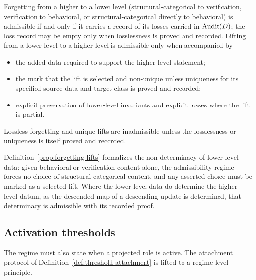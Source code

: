 \begin{definition}\label{prop:forgetting-lifts}
Forgetting from a higher to a lower level (structural-categorical to
verification, verification to behavioral, or structural-categorical directly to
behavioral) is admissible if and only if it carries a record of
its losses carried in \(\operatorname{Audit}\!\left(D\right)\); the loss record may be empty only when
losslessness is proved and recorded. Lifting from a lower level to a higher level is
admissible only when accompanied by
\begin{itemize}[topsep=2pt,itemsep=1pt]
  \item the added data required to support the higher-level statement;
  \item the mark that the lift is selected and non-unique unless uniqueness for its specified source data and target class is proved and recorded;
  \item explicit preservation of lower-level invariants and explicit
    losses where the lift is partial.
\end{itemize}
Lossless forgetting and unique lifts are inadmissible unless the losslessness
or uniqueness is itself proved and recorded.
\end{definition}

\begin{remark}\label{rem:lower-to-higher-non-determinacy}
Definition~\ref{prop:forgetting-lifts} formalizes the non-determinacy of
lower-level data: given behavioral or verification content alone, the admissibility regime
forces no choice of structural-categorical content, and any asserted choice
must be marked as a selected lift. Where the lower-level data do determine the
higher-level datum, as the descended map of a descending update is determined,
that determinacy is admissible with its recorded proof.
\end{remark}

\subsection{Activation thresholds}\label{subsec:activation-thresholds}

The regime must also state when a projected role is active. The
attachment protocol of Definition~\ref{def:threshold-attachment} is
lifted to a regime-level principle.

